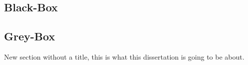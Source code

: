 \subsection{Black-Box}

\subsection{Grey-Box}



New section without a title, this is what this dissertation is going
to be about.







